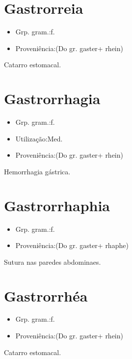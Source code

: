 \section{Gastrorreia}
\begin{itemize}
\item {Grp. gram.:f.}
\end{itemize}
\begin{itemize}
\item {Proveniência:(Do gr. \textunderscore gaster\textunderscore  + \textunderscore rhein\textunderscore )}
\end{itemize}
Catarro estomacal.
\section{Gastrorrhagia}
\begin{itemize}
\item {Grp. gram.:f.}
\end{itemize}
\begin{itemize}
\item {Utilização:Med.}
\end{itemize}
\begin{itemize}
\item {Proveniência:(Do gr. \textunderscore gaster\textunderscore  + \textunderscore rhein\textunderscore )}
\end{itemize}
Hemorrhagia gástrica.
\section{Gastrorrhaphia}
\begin{itemize}
\item {Grp. gram.:f.}
\end{itemize}
\begin{itemize}
\item {Proveniência:(Do gr. \textunderscore gaster\textunderscore  + \textunderscore rhaphe\textunderscore )}
\end{itemize}
Sutura nas paredes abdominaes.
\section{Gastrorrhéa}
\begin{itemize}
\item {Grp. gram.:f.}
\end{itemize}
\begin{itemize}
\item {Proveniência:(Do gr. \textunderscore gaster\textunderscore  + \textunderscore rhein\textunderscore )}
\end{itemize}
Catarro estomacal.
